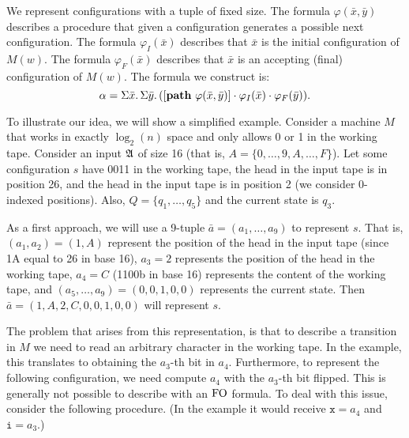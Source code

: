 We represent configurations with a tuple of fixed size. The formula $\varphi(\bar{x},\bar{y})$ describes a procedure that given a configuration generates a possible next configuration. The formula $\varphi_I(\bar{x})$ describes that $\bar{x}$ is the initial configuration of $M(w)$. The formula $\varphi_F(\bar{x})$ describes that $\bar{x}$ is an accepting (final) configuration of $M(w)$. The formula we construct is:
$$
\alpha = \Sigma{\bar{x}}.\,\Sigma{\bar{y}}.\,([{\bf path} \,\, \varphi(\bar{x},\bar{y})]\cdot \varphi_I(\bar{x})\cdot\varphi_F(\bar{y})).
$$

To illustrate our idea, we will show a simplified example. Consider a machine $M$ that works in exactly $\log_2(n)$ space and only allows 0 or 1 in the working tape. Consider an input $\mathfrak{A}$ of size 16 (that is, $A = \{0,\ldots,9,A,\ldots,F\}$). Let some configuration $s$ have 0011 in the working tape, the head in the input tape is in position 26, and the head in the input tape is in position 2 (we consider 0-indexed positions). Also, $Q = \{q_1,\ldots,q_5\}$ and the current state is $q_3$.

As a first approach, we will use a 9-tuple $\bar{a} = (a_1,\ldots,a_9)$ to represent $s$. That is, $(a_1,a_2) = (1,A)$ represent the position of the head in the input tape (since 1A equal to 26 in base 16), $a_3 = 2$ represents the position of the head in the working tape, $a_4 = C$ (1100b in base 16) represents the content of the working tape, and $(a_5,\ldots,a_9) = (0,0,1,0,0)$ represents the current state. Then $\bar{a} = (1,A,2,C,0,0,1,0,0)$ will represent $s$.

\newcommand\algx{\mathtt{x}}
\newcommand\algy{\mathtt{y}}
\newcommand\algz{\mathtt{z}}
\newcommand\algu{\mathtt{u}}
\newcommand\algv{\mathtt{v}}
\newcommand\algi{\mathtt{i}}
\newcommand\algj{\mathtt{j}}


The problem that arises from this representation, is that to describe a transition in $M$ we need to read an arbitrary character in the working tape. In the example, this translates to obtaining the $a_3$-th bit in $a_4$. Furthermore, to represent the following configuration, we need compute $a_4$ with the $a_3$-th bit flipped. This is generally not possible to describe with an ${\rm FO}$ formula. To deal with this issue, consider the following procedure. (In the example it would receive $\algx = a_4$ and $\algi = a_3$.)


